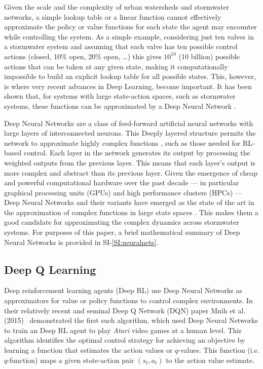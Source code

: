 Given the scale and the complexity of urban watersheds and stormwater networks, a simple lookup table or a linear  function cannot effectively approximate the policy or value functions for each state the agent may encounter while controlling the system.
As a simple example, considering just ten valves in a stormwater system and assuming that each valve has ten possible control actions (closed, 10\% open, 20\% open, \ldots) this gives $10^{10}$ (10 billion) possible actions that can be taken at any given state, making it computationally impossible to build an explicit lookup table for all possible states.
This, however, is where very recent advances in Deep Learning, become important.
It has been shown that, for systems with large state-action spaces, such as stormwater systems, these functions can be approximated by a Deep Neural Network  \cite{Sutton98,Mnih2015}.

Deep Neural Networks are a class of feed-forward artificial neural networks with large layers of interconnected neurons.
This Deeply layered structure permits the network to approximate highly complex functions \cite{hornik1989multilayer}, such as those needed for RL-based control.
Each layer in the network generates its output by processing the weighted outputs from the previous layer.
This means that each layer's output is more complex and abstract than its previous layer.
Given the emergence of cheap and powerful computational hardware over the past decade --- in particular graphical processing units (GPUs) and high performance clusters (HPCs) --- Deep Neural Networks and their variants have emerged as the state of the art in the approximation of complex functions in large state spaces \cite{LeCun2015DeepLearning}.
This makes them a good candidate for approximating the complex dynamics across stormwater systems. For purposes of this paper, a brief mathematical summary of Deep Neural Networks is provided in SI-\ref{SI:neuralnets}.

\subsection{Deep Q Learning}

Deep reinforcement learning agents (Deep RL) use Deep Neural Networks as approximators for value or policy functions to control complex environments.
In their relatively recent and seminal Deep Q Network (DQN) paper Mnih et al. (2015)~\cite{Mnih2015} demonstrated the first such algorithm, which used Deep Neural Networks to train an Deep RL agent to play \textit{Atari} video games at a human level.
This algorithm identifies the optimal control strategy for achieving an objective by learning a function that estimates the action values or $q$-values.
This function (i.e. $q$-function) maps a given state-action pair $(s_t,a_t)$ to the action value estimate.

